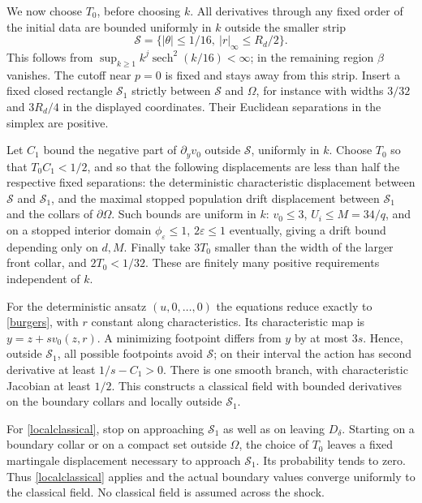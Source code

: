 \documentclass[11pt]{article}
\begin{document}
We now choose $T_0$, before choosing $k$. All derivatives through any fixed order of the initial data are bounded uniformly in $k$ outside the smaller strip
\[
 \mathcal S=\{|\theta|\le1/16,\ |r|_\infty\le R_d/2\}.
\]
This follows from $\sup_{k\ge1}k^j\operatorname{sech}^2(k/16)<\infty$; in the remaining region $\beta$ vanishes. The cutoff near $p=0$ is fixed and stays away from this strip. Insert a fixed closed rectangle $\mathcal S_1$ strictly between $\mathcal S$ and $\Omega$, for instance with widths $3/32$ and $3R_d/4$ in the displayed coordinates. Their Euclidean separations in the simplex are positive.

Let $C_1$ bound the negative part of $\partial_yv_0$ outside $\mathcal S$, uniformly in $k$. Choose $T_0$ so that $T_0C_1<1/2$, and so that the following displacements are less than half the respective fixed separations: the deterministic characteristic displacement between $\mathcal S$ and $\mathcal S_1$, and the maximal stopped population drift displacement between $\mathcal S_1$ and the collars of $\partial\Omega$. Such bounds are uniform in $k$: $v_0\le3$, $U_i\le M=34/q$, and on a stopped interior domain $\phi_\varepsilon\le1$, $2\varepsilon\le1$ eventually, giving a drift bound depending only on $d,M$. Finally take $3T_0$ smaller than the width of the larger front collar, and $2T_0<1/32$. These are finitely many positive requirements independent of $k$.

For the deterministic ansatz $(u,0,\ldots,0)$ the equations reduce exactly to \eqref{burgers}, with $r$ constant along characteristics. Its characteristic map is $y=z+sv_0(z,r)$. A minimizing footpoint differs from $y$ by at most $3s$. Hence, outside $\mathcal S_1$, all possible footpoints avoid $\mathcal S$; on their interval the action has second derivative at least $1/s-C_1>0$. There is one smooth branch, with characteristic Jacobian at least $1/2$. This constructs a classical field with bounded derivatives on the boundary collars and locally outside $\mathcal S_1$.

For \eqref{localclassical}, stop on approaching $\mathcal S_1$ as well as on leaving $D_\delta$. Starting on a boundary collar or on a compact set outside $\Omega$, the choice of $T_0$ leaves a fixed martingale displacement necessary to approach $\mathcal S_1$. Its probability tends to zero. Thus \eqref{localclassical} applies and the actual boundary values converge uniformly to the classical field. No classical field is assumed across the shock.
\end{document}

